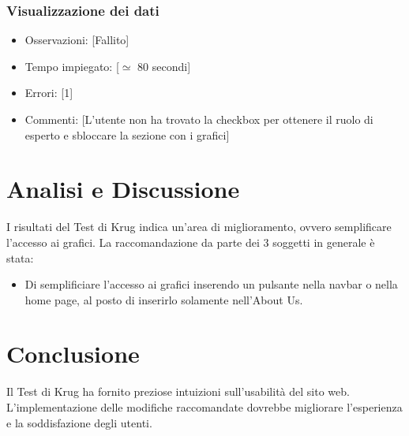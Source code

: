 \documentclass[a4paper,12pt]{article}
\begin{document}
\subsubsection{Visualizzazione dei dati}
\begin{itemize}
    \item Osservazioni: [Fallito]
    \item Tempo impiegato: [$\simeq$ 80 secondi]
    \item Errori: [1]
    \item Commenti: [L'utente non ha trovato la checkbox per ottenere il ruolo di esperto e sbloccare la sezione con i grafici]
\end{itemize}

\section{Analisi e Discussione}
I risultati del Test di Krug indica un'area di miglioramento, ovvero semplificare l'accesso ai grafici. La raccomandazione da parte dei 3 soggetti in generale è stata:
\begin{itemize}
    \item Di semplificiare l'accesso ai grafici inserendo un pulsante nella navbar o nella home page, al posto di inserirlo solamente nell'About Us.
\end{itemize}

\section{Conclusione}
Il Test di Krug ha fornito preziose intuizioni sull'usabilità del sito web. L'implementazione delle modifiche raccomandate dovrebbe migliorare l'esperienza e la soddisfazione degli utenti.
\end{document}
